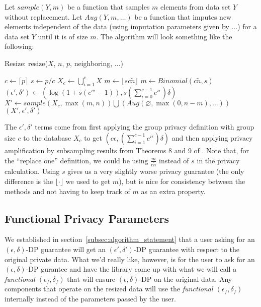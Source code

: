 \documentclass[11pt]{scrartcl} %
\begin{document}
Let $sample(Y, m)$ be a function that samples $m$ elements from data set $Y$ without replacement. 
Let $Aug(Y, m, \hdots)$ be a function that imputes new elements independent of the data (using imputation parameters given by $\hdots$) for a data set $Y$ until it is of size $m$. 
The algorithm will look something like the following:
\begin{algorithm}[H]
    \caption{Resize: resize($X$, $n$, $p$, neighboring, ...)}
    \label{alg:gen_resize}
    \begin{algorithmic}[1]
        \State $c \gets \lceil p \rceil$ 
        \State $s \gets p/c$ 
        \State $X_c \gets \bigcup_{i=1}^{c}X$ 
            \State $m \gets \lfloor sc\tilde{n} \rfloor$ 
            \State $m \gets Binomial(c\tilde{n}, s)$ 
        \EndIf
        \State $(\epsilon', \delta') \gets \left(\log\left(1+s\left(e^{c\epsilon}-1\right) \right), s\left(\sum_{i=0}^{c-1}e^{i \epsilon}\right)\delta \right)$ 
        \State $X' \gets sample\left( X_c, \max(m, n) \right) \bigcup \left( Aug(\varnothing, \max(0, n - m), \hdots) \right)$
        \\ \Return $(X', \epsilon', \delta')$
    \end{algorithmic}
\end{algorithm}

The $\epsilon', \delta'$ terms come from first applying the group privacy definition with group size $c$ to the 
database $X_c$ to get $\left(c\epsilon, \left(\sum_{i=1}^{c-1}e^{i \epsilon}\right)\delta \right)$ \cite{Vad17}
and then applying privacy amplification by subsampling results from Theorems 8 and 9 of \cite{BBG18}. 
Note that, for the ``replace one'' definition, we could be using $\frac{m}{c\tilde{n}}$ instead of $s$ in the privacy calculation. Using $s$ gives us a very slightly 
worse privacy guarantee (the only difference is the $\lfloor \cdot \rfloor$ we used to get $m$), but is nice for 
consistency between the methods and not having to keep track of $m$ as an extra property.

\subsection{Functional Privacy Parameters}
We established in section~\ref{subsec:algorithm_statement} that a user asking for an $(\epsilon, \delta)$-DP guarantee will get an 
$(\epsilon', \delta')$-DP guarantee with respect to the original private data. What we'd really like, however, is for the user to ask for an $(\epsilon, \delta)$-DP 
gurantee and have the library come up with what we will call a \emph{functional $(\epsilon_f, \delta_f)$} that will ensure $(\epsilon, \delta)$-DP 
on the original data. Any components that operate on the resized data will use the \emph{functional $(\epsilon_f, \delta_f)$} internally instead of 
the parameters passed by the user.
\end{document}
